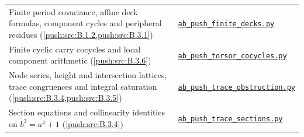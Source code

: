 {\begin{longtable}{@{}>{\raggedright\arraybackslash}p{}>{\raggedright\arraybackslash}p{}@{}}
Finite period covariance, affine deck formulas, component cycles and peripheral residues (\cref{push:src:B.1.2,push:src:B.3.1}) & \href{https://raw.githubusercontent.com/KokunoYumeto/s6-complex-structure-workbench/\SsixRepositoryCommit/pro_returns/S6_02_PUSH_final_20261115T2217Z/S6_02_PUSH/code/ab_push_finite_decks.py}{\texttt{ab\_push\_finite\_decks.py}} \\
Finite cyclic carry cocycles and local component arithmetic (\cref{push:src:B.3.6}) & \href{https://raw.githubusercontent.com/KokunoYumeto/s6-complex-structure-workbench/\SsixRepositoryCommit/pro_returns/S6_02_PUSH_final_20261115T2217Z/S6_02_PUSH/code/ab_push_torsor_cocycles.py}{\texttt{ab\_push\_torsor\_cocycles.py}} \\
Node series, height and intersection lattices, trace congruences and integral saturation (\cref{push:src:B.3.4,push:src:B.3.5}) & \href{https://raw.githubusercontent.com/KokunoYumeto/s6-complex-structure-workbench/\SsixRepositoryCommit/pro_returns/S6_02_PUSH_final_20261115T2217Z/S6_02_PUSH/code/ab_push_trace_obstruction.py}{\texttt{ab\_push\_trace\_obstruction.py}} \\
Section equations and collinearity identities on $b^3=a^4+1$ (\cref{push:src:B.3.4}) & \href{https://raw.githubusercontent.com/KokunoYumeto/s6-complex-structure-workbench/\SsixRepositoryCommit/pro_returns/S6_02_PUSH_final_20261115T2217Z/S6_02_PUSH/code/ab_push_trace_sections.py}{\texttt{ab\_push\_trace\_sections.py}} \\
\end{longtable}
}

\clearpage
